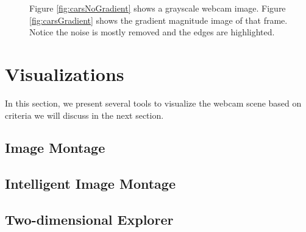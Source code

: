 \begin{figure}
	\centering
		\caption[Focusing on object edges with gradient magnitude images.]{Figure \ref{fig:carsNoGradient} shows a grayscale webcam image. Figure \ref{fig:carsGradient} shows the gradient magnitude image of that frame.  Notice the noise is mostly removed and the edges are highlighted.}
\end{figure}

\section{Visualizations}

In this section, we present several tools to visualize the webcam scene based on criteria we will discuss in the next section.

\subsection{Image Montage}

\subsection{Intelligent Image Montage}

\subsection{Two-dimensional Explorer}

